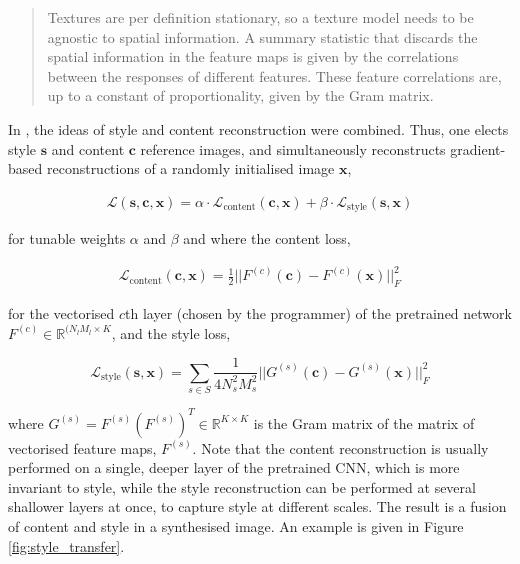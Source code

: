 \begin{quotation}
Textures are per definition stationary, so a texture model needs to be agnostic to spatial information. A summary statistic that discards the spatial information in the feature maps is given by the correlations between the responses of different features. These feature correlations are, up to a constant of proportionality, given by the Gram matrix.
\end{quotation}

In \cite{gatys2016image}, the ideas of style and content reconstruction were combined. Thus, one elects style $\mathbf{s}$ and content $\mathbf{c}$ reference images, and simultaneously reconstructs gradient-based reconstructions of a randomly initialised image $\mathbf{x}$,

\begin{align}
\mathcal{L}(\mathbf{s}, \mathbf{c}, \mathbf{x}) = \alpha\cdot\mathcal{L}_{\text{content}}(\mathbf{c}, \mathbf{x}) + \beta\cdot\mathcal{L}_{\text{style}}(\mathbf{s},\mathbf{x})
\end{align}

for tunable weights $\alpha$ and $\beta$ and where the content loss,

\begin{align}
\mathcal{L}_{\text{content}}(\mathbf{c}, \mathbf{x}) = \frac{1}{2}||F^{(c)}(\mathbf{c}) - F^{(c)}(\mathbf{x})||_F^2
\end{align}

for the vectorised $c$th layer (chosen by the programmer) of the pretrained network $F^{(c)} \in \mathbb{R}^{(N_lM_l \times K}$, and the style loss,

\begin{equation}
\mathcal{L}_{\text{style}}(\mathbf{s}, \mathbf{x}) = \sum_{s \in S}\frac{1}{4N_s^2M_s^2}||G^{(s)}(\mathbf{c}) - G^{(s)}(\mathbf{x})||_F^2
\label{eq:style_loss}
\end{equation}

where $G^{(s)} = F^{(s)}(F^{(s)})^T \in \mathbb{R}^{K \times K}$ is the Gram matrix of the matrix of vectorised feature maps, $F^{(s)}$. Note that the content reconstruction is usually performed on a single, deeper layer of the pretrained CNN, which is more invariant to style, while the style reconstruction can be performed at several shallower layers at once, to capture style at different scales. The result is a fusion of content and style in a synthesised image. An example is given in Figure \ref{fig:style_transfer}.

